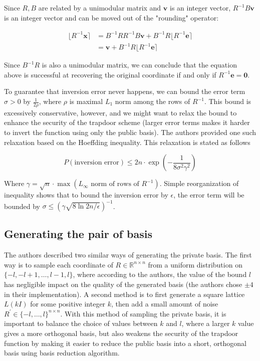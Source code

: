 Since $R, B$ are related by a unimodular matrix and $\mathbf{v}$ is an integer vector, $R^{-1}B\mathbf{v}$ is an integer vector and can be moved out of the "rounding" operator:

$$
\begin{aligned}
\lfloor R^{-1}\mathbf{x} \rceil &= B^{-1}RR^{-1}B\mathbf{v} + B^{-1}R\lfloor R^{-1}\mathbf{e}\rceil \\
&= \mathbf{v} + B^{-1}R\lfloor R^{-1}\mathbf{e} \rceil
\end{aligned}
$$

Since $B^{-1}R$ is also a unimodular matrix, we can conclude that the equation above is successful at recovering the original coordinate if and only if $R^{-1}\mathbf{e} = \mathbf{0}$.

To guarantee that inversion error never happens, we can bound the error term $\sigma > 0$ by $\frac{1}{2\rho}$, where $\rho$ is maximal $L_1$ norm among the rows of $R^{-1}$. This bound is excessively conservative, however, and we might want to relax the bound to enhance the security of the trapdoor scheme (larger error terms makes it harder to invert the function using only the public basis). The authors provided one such relaxation based on the Hoeffding inequality. This relaxation is stated as follows

$$
P(\text{inversion error}) \leq 2n \cdot \exp(-\frac{1}{8\sigma^2\gamma^2})
$$

Where $\gamma = \sqrt{n} \cdot \max(L_\infty \text{ norm of rows of } R^{-1})$. Simple reorganization of inequality shows that to bound the inversion error by $\epsilon$, the error term will be bounded by $\sigma \leq (\gamma\sqrt{8\ln{2n/\epsilon}})^{-1}$.

\subsection{Generating the pair of basis}
The authors described two similar ways of generating the private basis. The first way is to sample each coordinate of $R \in \mathbb{R}^{n \times n}$ from a uniform distribution on $\{-l, -l + 1, \ldots, l-1, l\}$, where according to the authors, the value of the bound $l$ has negligible impact on the quality of the generated basis (the authors chose $\pm 4$ in their implementation). A second method is to first generate a square lattice $L(kI)$ for some positive integer $k$, then add a small amount of noise $R^\prime \in \{-l, \ldots, l\}^{n \times n}$. With this method of sampling the private basis, it is important to balance the choice of values between $k$ and $l$, where a larger $k$ value gives a more orthogonal basis, but also weakens the security of the trapdoor function by making it easier to reduce the public basis into a short, orthogonal basis using basis reduction algorithm.

